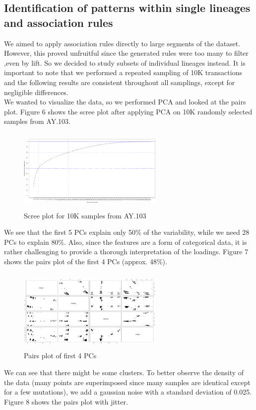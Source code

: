 \documentclass[twoside,twocolumn]{article}
\begin{document}
	\subsection{Identification of patterns within single lineages and association rules}
	
	We aimed to apply association rules directly to large segments of the dataset. However, this proved unfruitful since the generated rules were too many to filter ,even by lift. So we decided to study subsets of individual lineages instead. It is important to note that we performed a repeated sampling of 10K transactions and the following results are consistent throughout all samplings, except for negligible differences. \\We wanted to visualize the data, so we performed PCA and looked at the pairs plot. Figure 6 shows the scree plot after applying PCA on 10K randomly selected samples from AY.103.
	\begin{figure}[h]
		\caption{Scree plot for 10K samples from AY.103}
		\label{screeplot1}
		\centering
		\includegraphics[width=70mm, height=40mm]{scree.png}
	\end{figure}
	We see that the first 5 PCs explain only 50\% of the variability, while we need 28 PCs to explain 80\%. Also, since the features are a form of categorical data, it is rather challenging to provide a thorough interpretation of the loadings. Figure 7 shows the pairs plot of the first 4 PCs (approx. 48\%).
	\begin{figure}[h]
		\caption{Pairs plot of first 4 PCs}
		\label{pairs}
		\centering
		\includegraphics[width=70mm, height=40mm]{pca1.png}
	\end{figure}
	We can see that there might be some clusters. To better observe the density of the data (many points are superimposed since many samples are identical except for a few mutations), we add a gaussian noise with a standard deviation of 0.025. Figure 8 shows the pairs plot with jitter.
\end{document}
